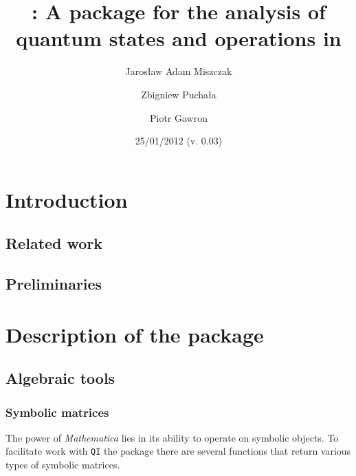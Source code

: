 \documentclass[11pt,a4paper]{article}
\date{25/01/2012 (v. 0.03)}
\title{\qi: A package for the analysis of quantum states and operations in
\Mathematica}
\author{Jarosław Adam Miszczak \and Zbigniew Pucha\l{}a \and Piotr Gawron}
\newcommand{\qi}{\texttt{QI}}
\newcommand{\Mathematica}{\emph{Mathematica}}
\newcommand{\1}{{\bf 1}}
\begin{document}
\maketitle

\section{Introduction}

\subsection{Related work}

\subsection{Preliminaries}

\section{Description of the package}

\subsection{Algebraic tools}

\subsubsection{Symbolic matrices}
The power of \Mathematica{} lies in its ability to operate on symbolic objects.
To facilitate work with \qi{} the package there are several functions that 
return various types of symbolic matrices.
\end{document}
